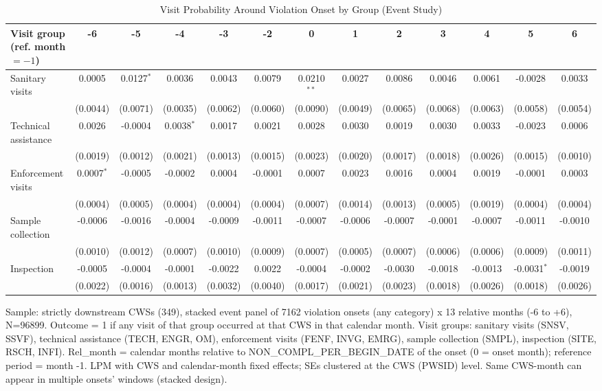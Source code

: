 \begin{table}[htbp]
   \caption{\label{tab:sanitary_visit_event_study} Visit Probability Around Violation Onset by Group (Event Study)}
   \bigskip
   \centering
   \begin{adjustbox}{width = \textwidth, center}
      \begin{tabular}{lcccccccccccc}
         \toprule
         Visit group (ref. month $=-1$) & -6 & -5 & -4 & -3 & -2 & 0 & 1 & 2 & 3 & 4 & 5 & 6 \\
         \midrule
         Sanitary visits & 0.0005 & 0.0127$^{*}$ & 0.0036 & 0.0043 & 0.0079 & 0.0210$^{**}$ & 0.0027 & 0.0086 & 0.0046 & 0.0061 & -0.0028 & 0.0033 \\
          & (0.0044) & (0.0071) & (0.0035) & (0.0062) & (0.0060) & (0.0090) & (0.0049) & (0.0065) & (0.0068) & (0.0063) & (0.0058) & (0.0054) \\
         Technical assistance & 0.0026 & -0.0004 & 0.0038$^{*}$ & 0.0017 & 0.0021 & 0.0028 & 0.0030 & 0.0019 & 0.0030 & 0.0033 & -0.0023 & 0.0006 \\
          & (0.0019) & (0.0012) & (0.0021) & (0.0013) & (0.0015) & (0.0023) & (0.0020) & (0.0017) & (0.0018) & (0.0026) & (0.0015) & (0.0010) \\
         Enforcement visits & 0.0007$^{*}$ & -0.0005 & -0.0002 & 0.0004 & -0.0001 & 0.0007 & 0.0023 & 0.0016 & 0.0004 & 0.0019 & -0.0001 & 0.0003 \\
          & (0.0004) & (0.0005) & (0.0004) & (0.0004) & (0.0004) & (0.0007) & (0.0014) & (0.0013) & (0.0005) & (0.0019) & (0.0004) & (0.0004) \\
         Sample collection & -0.0006 & -0.0016 & -0.0004 & -0.0009 & -0.0011 & -0.0007 & -0.0006 & -0.0007 & -0.0001 & -0.0007 & -0.0011 & -0.0010 \\
          & (0.0010) & (0.0012) & (0.0007) & (0.0010) & (0.0009) & (0.0007) & (0.0005) & (0.0007) & (0.0006) & (0.0006) & (0.0009) & (0.0011) \\
         Inspection & -0.0005 & -0.0004 & -0.0001 & -0.0022 & 0.0022 & -0.0004 & -0.0002 & -0.0030 & -0.0018 & -0.0013 & -0.0031$^{*}$ & -0.0019 \\
          & (0.0022) & (0.0016) & (0.0013) & (0.0032) & (0.0040) & (0.0017) & (0.0021) & (0.0023) & (0.0018) & (0.0026) & (0.0018) & (0.0026) \\
         \bottomrule
      \end{tabular}
   \end{adjustbox}
      {\tiny\linespread{1}\selectfont \par \raggedright Sample: strictly downstream CWSs (349), stacked event panel of 7162 violation onsets (any category) x 13 relative months (-6 to +6), N=96899. Outcome = 1 if any visit of that group occurred at that CWS in that calendar month. Visit groups: sanitary visits (SNSV, SSVF), technical assistance (TECH, ENGR, OM), enforcement visits (FENF, INVG, EMRG), sample collection (SMPL), inspection (SITE, RSCH, INFI). Rel\_month = calendar months relative to NON\_COMPL\_PER\_BEGIN\_DATE of the onset (0 = onset month); reference period = month -1. LPM with CWS and calendar-month fixed effects; SEs clustered at the CWS (PWSID) level. Same CWS-month can appear in multiple onsets' windows (stacked design).}
\end{table}

